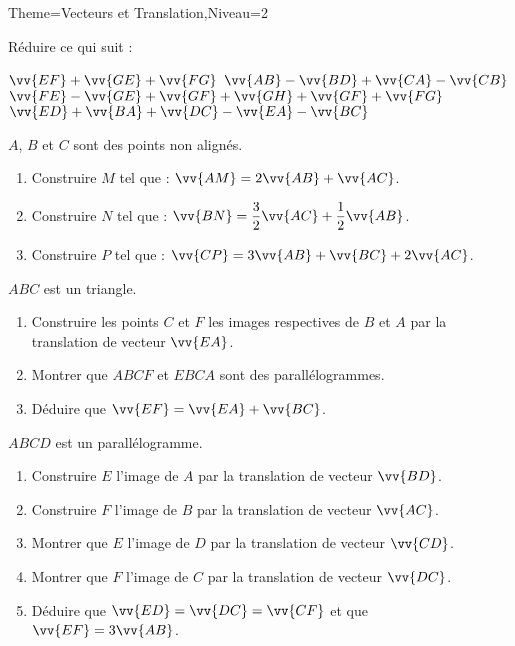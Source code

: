 \documentclass[a4paper,12pt]{article}
\begin{document}
\begin{Maquette}[Fiche]{Theme=Vecteurs et Translation,Niveau=2}
\begin{exercice}
Réduire ce qui suit :
\begin{tasks}
\task $\vv{EF}+\vv{GE}+\vv{FG}$
\task $\vv{AB}-\vv{BD}+\vv{CA}-\vv{CB}$
\task $\vv{FE}-\vv{GE}+\vv{GF}+\vv{GH}+\vv{GF}+\vv{FG}$
\task $\vv{ED}+\vv{BA}+\vv{DC}-\vv{EA}-\vv{BC}$
\end{tasks}
\end{exercice}

\begin{exercice}
$A$, $B$ et $C$ sont des points non alignés.
\begin{enumerate}
\item Construire $M$ tel que : $\vv{AM}=2\vv{AB}+\vv{AC}$.
\item Construire $N$ tel que : $\vv{BN}=\dfrac{3}{2}\vv{AC}+\dfrac{1}{2}\vv{AB}$.
\item Construire $P$ tel que : $\vv{CP}=3\vv{AB}+\vv{BC}+2\vv{AC}$.
\end{enumerate}
\end{exercice}

\begin{exercice}
$ABC$ est un triangle.
\begin{enumerate}
\item Construire les points $C$ et $F$ les images respectives de $B$ et $A$ par la translation de vecteur $\vv{EA}$.
\item Montrer que $ABCF$ et $EBCA$ sont des parallélogrammes.
\item Déduire que $\vv{EF}=\vv{EA}+\vv{BC}$.
\end{enumerate}
\end{exercice}

\begin{exercice}
$ABCD$ est un parallélogramme.
\begin{enumerate}
\item Construire $E$ l'image de $A$ par la translation de vecteur $\vv{BD}$.
\item Construire $F$ l'image de $B$ par la translation de vecteur $\vv{AC}$.
\item Montrer que  $E$ l'image de $D$ par la translation de vecteur $\vv{CD}$.
\item Montrer que  $F$ l'image de $C$ par la translation de vecteur $\vv{DC}$.
\item Déduire que $\vv{ED}=\vv{DC}=\vv{CF}$ et que $\vv{EF}=3\vv{AB}$.
\end{enumerate}
\end{exercice}




\end{Maquette}
\end{document}
